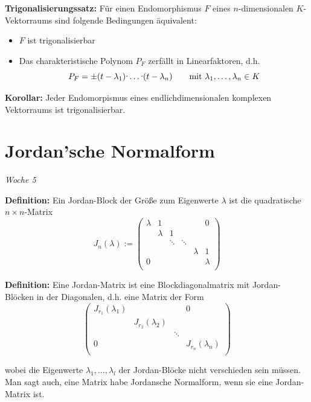 \documentclass{article}
\let\oldcdot\cdot
\renewcommand{\cdot}{\raisebox{0.1ex}{$\oldcdot$}}
\begin{document}
\textbf{Trigonalisierungssatz:} Für einen Endomorphismus $F$ eines
$n$-dimensionalen $K$-Vektorraums sind folgende Bedingungen äquivalent:
\begin{itemize}
\item[i)] $F$ ist trigonalisierbar
\item[ii)] Das charakteristische Polynom $P_F$ zerfällt in Linearfaktoren, d.h.
	\begin{equation*}
		P_F=\pm(t-\lambda_1)\cdot\dots\cdot(t-\lambda_n)\qquad\text{mit
		}\lambda_1,\dots,\lambda_n\in K
	\end{equation*}
\end{itemize}

\textbf{Korollar:} Jeder Endomorpismus eines endlichdimensionalen komplexen
Vektorraums ist trigonalisierbar.

\section{Jordan'sche Normalform}
\textit{\small \hspace{-1.5cm}Woche 5}

\textbf{Definition:} Ein Jordan-Block der Größe zum Eigenwerte
$\lambda$ ist die quadratische $n\times n$-Matrix
\begin{equation*}
	J_n(\lambda):=
\begin{pmatrix}
	\lambda & 1 & & & & 0\\
	& \lambda & 1 & & &  \\
	& & \ddots & \ddots & &  \\
	& &  & & \lambda & 1 \\
	0 & &  & & & \lambda\\
\end{pmatrix}
\end{equation*}

\textbf{Definition:} Eine Jordan-Matrix ist eine Blockdiagonalmatrix mit
Jordan-Blöcken in der Diagonalen, d.h. eine Matrix der Form
\begin{equation*}
	\begin{pmatrix}
		J_{r_1}(\lambda_1) & & & 0\\
		& J_{r_2}(\lambda_2)  & & \\
		& & \ddots &\\
		0 & & & J_{r_n}(\lambda_n)\\
	\end{pmatrix}
\end{equation*}

wobei die Eigenwerte $\lambda_1,\dots,\lambda_l$ der Jordan-Blöcke nicht
verschieden sein müssen. Man sagt auch, eine Matrix habe Jordansche Normalform,
wenn sie eine Jordan-Matrix ist.
\end{document}
